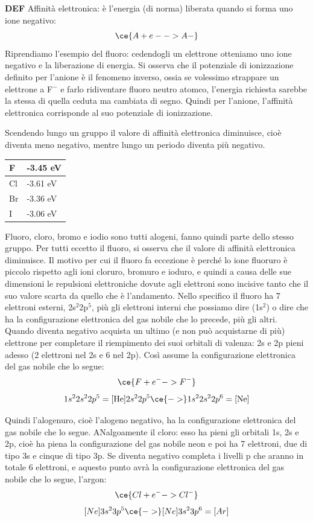 \textbf{DEF} Affinità elettronica: è l'energia (di norma) liberata quando si forma uno ione negativo:
$$\ce{ A + e- -> A-}$$ 
Riprendiamo l'esempio del fluoro: cedendogli un elettrone otteniamo uno ione negativo e la liberazione di energia. Si osserva che il potenziale di ionizzazione definito per l'anione è il fenomeno inverso, ossia se volessimo strappare un elettrone a F$^-$ e farlo ridiventare fluoro neutro atomco, l'energia richiesta sarebbe la stessa di quella ceduta ma cambiata di segno. Quindi per l'anione, l'affinità elettronica corrisponde al suo potenziale di ionizzazione.

Scendendo lungo un gruppo il valore di affinità elettronica diminuisce, cioè diventa meno negativo, mentre lungo un periodo diventa più negativo.
\begin{center}
    \begin{tabular}{ m{1cm}|m{2cm} } 
     F & -3.45 eV \\ 
     \hline
     Cl & -3.61 eV \\
     \hline
     Br & -3.36 eV \\ 
     \hline
     I & -3.06 eV \\
     \hline
    \end{tabular}
    \end{center}
Fluoro, cloro, bromo e iodio sono tutti alogeni, fanno quindi parte dello stesso gruppo. Per tutti eccetto il fluoro, si osserva che il valore di affinità elettronica diminuisce. Il motivo per cui il fluoro fa eccezione è perché lo ione fluoruro è piccolo rispetto agli ioni cloruro, bromuro e ioduro, e quindi a causa delle sue dimensioni le repulsioni elettroniche dovute agli elettroni sono incisive tanto che il suo valore scarta da quello che è l'andamento. Nello specifico il fluoro ha 7 elettroni esterni, 2s$^2$2p$^5$, più gli elettroni interni che possiamo dire (1s$^2$) o dire che ha la configurazione elettronica del gas nobile che lo precede, più gli altri. Quando diventa negativo acquista un ultimo (e non può acquistarne di più) elettrone per completare il riempimento dei suoi orbitali di valenza: 2s e 2p pieni adesso (2 elettroni nel 2s e 6 nel 2p). Così assume la configurazione elettronica del gas nobile che lo segue:
$$\ce{F + e^- -> F^-}$$
$$1s^22s^22p^5= \text{[He]}2s^22p^5\ce{->}1s^22s^22p^6=\text{[Ne]}$$

Quindi l'alogenuro, cioè l'alogeno negativo, ha la configurazione elettronica del gas nobile che lo segue. ANalgoamente il cloro: esso ha pieni gli orbitali 1s, 2s e 2p, cioè ha piena la configurazione del gas nobile neon e poi ha 7 elettroni, due di tipo 3s e cinque di tipo 3p. Se diventa negativo completa i livelli p che aranno in totale 6 elettroni, e aquesto punto avrà la configurazione elettronica del gas nobile che lo segue, l'argon:
$$\ce{Cl+e^- -> Cl^-}$$
$$[Ne]3s^23p^5 \ce{->} [Ne]3s^23p^6=[Ar]$$

